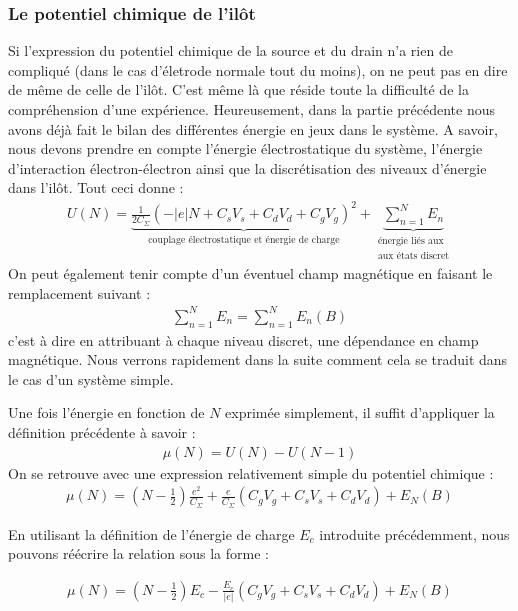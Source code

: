 \subsubsection{Le potentiel chimique de l'il\^ot}
Si l'expression du potentiel chimique de la source et du drain n'a rien de compliqué (dans le cas d'életrode normale tout du moins), on ne peut pas en dire de m\^eme de celle de l'il\^ot. C'est m\^eme là que réside toute la difficulté de la compréhension d'une expérience. Heureusement, dans la partie précédente nous avons déjà fait le bilan des différentes énergie en jeux dans le système. A savoir, nous devons prendre en compte l'énergie électrostatique du système, l'énergie d'interaction électron-électron ainsi que la discrétisation des niveaux d'énergie dans l'il\^ot. Tout ceci donne :
\begin{eqnarray}
U(N) = \underbrace{\frac{1}{2C_{\Sigma}} (-|e|N + C_sV_s + C_dV_d + C_gV_g)^2}_{\text{couplage électrostatique et énergie de charge}}
+ 
\underbrace{\sum_{n=1}^{N} E_n}_{\substack{\text{énergie liés aux} \\\text{aux états discret}}}
\end{eqnarray}
On peut également tenir compte d'un éventuel champ magnétique en faisant le remplacement suivant :
\begin{eqnarray}
\sum_{n=1}^N E_n = \sum_{n=1}^N E_n(B) \nonumber
\end{eqnarray}
c'est à dire en attribuant à chaque niveau discret, une dépendance en champ magnétique. Nous verrons rapidement dans la suite comment cela se traduit dans le cas d'un système simple. 

Une fois l'énergie en fonction de $N$ exprimée simplement, il suffit d'appliquer la définition précédente à savoir :
\begin{eqnarray}
\mu(N) = U(N) - U(N-1) \nonumber
\end{eqnarray}
On se retrouve avec une expression relativement simple du potentiel chimique :
\begin{eqnarray}
\mu(N) = (N-\frac{1}{2})\frac{e^2}{C_{\Sigma}}
+ 
\frac{e}{C_{\Sigma}}(C_gV_g + C_sV_s + C_dV_d)
+
E_N(B)
\end{eqnarray}

En utilisant la définition de l'énergie de charge $E_c$ introduite précédemment, nous pouvons réécrire la relation sous la forme :

\begin{eqnarray}
\mu(N) = (N-\frac{1}{2})E_c
- 
\frac{E_c}{|e|}(C_gV_g + C_sV_s + C_dV_d)
+
E_N(B)
\label{pot_chim}
\end{eqnarray}

